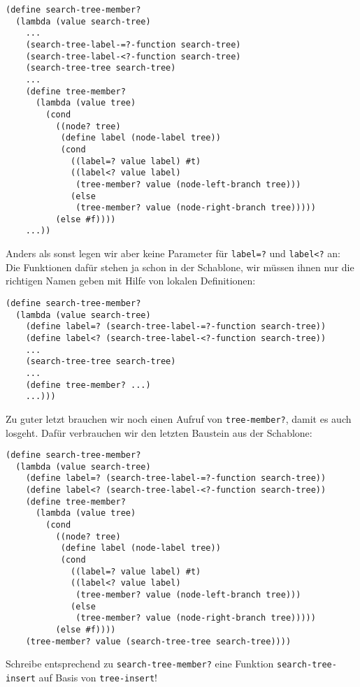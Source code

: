 %
\begin{lstlisting}
(define search-tree-member?
  (lambda (value search-tree)
    ...
    (search-tree-label-=?-function search-tree)
    (search-tree-label-<?-function search-tree)
    (search-tree-tree search-tree)
    ...
    (define tree-member?
      (lambda (value tree)
        (cond
          ((node? tree)
           (define label (node-label tree))
           (cond
             ((label=? value label) #t)
             ((label<? value label)
              (tree-member? value (node-left-branch tree)))
             (else
              (tree-member? value (node-right-branch tree)))))
          (else #f))))
    ...))
\end{lstlisting}
%
Anders als sonst legen wir aber keine Parameter für
\lstinline{label=?} und \lstinline{label<?} an: Die Funktionen
dafür stehen ja schon in der Schablone, wir müssen ihnen nur die
richtigen Namen geben mit Hilfe von lokalen Definitionen:
%
\begin{lstlisting}
(define search-tree-member?
  (lambda (value search-tree)
    (define label=? (search-tree-label-=?-function search-tree))
    (define label<? (search-tree-label-<?-function search-tree))
    ...
    (search-tree-tree search-tree)
    ...
    (define tree-member? ...)
    ...)))
\end{lstlisting}
%
Zu guter letzt brauchen wir noch einen Aufruf von \lstinline{tree-member?}, damit es auch losgeht.
Dafür verbrauchen wir den letzten Baustein aus der Schablone:
%
\begin{lstlisting}
(define search-tree-member?
  (lambda (value search-tree)
    (define label=? (search-tree-label-=?-function search-tree))
    (define label<? (search-tree-label-<?-function search-tree))
    (define tree-member?
      (lambda (value tree)
        (cond
          ((node? tree)
           (define label (node-label tree))
           (cond
             ((label=? value label) #t)
             ((label<? value label)
              (tree-member? value (node-left-branch tree)))
             (else
              (tree-member? value (node-right-branch tree)))))
          (else #f))))
    (tree-member? value (search-tree-tree search-tree))))
\end{lstlisting}
%
\begin{aufgabeinline}
  Schreibe entsprechend zu \lstinline{search-tree-member?} eine
  Funktion \lstinline{search-tree-insert} auf Basis von
  \lstinline{tree-insert}!
\end{aufgabeinline}

